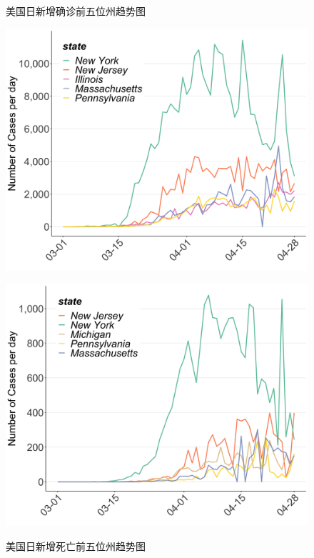 \documentclass[]{article}
\begin{document}
\begin{figure}[H]
\centering
\begin{minipage}[b]{0.45\linewidth}
\caption{美国日新增确诊前五位州趋势图}
\includegraphics[]{./input/covid5.png}
\label{}
\end{minipage}
\quad
\begin{minipage}[b]{0.45\linewidth}
\caption{美国日新增死亡前五位州趋势图}
\includegraphics[]{./input/covid6.png}
\label{}
\end{minipage}
\end{figure}
\end{document}
